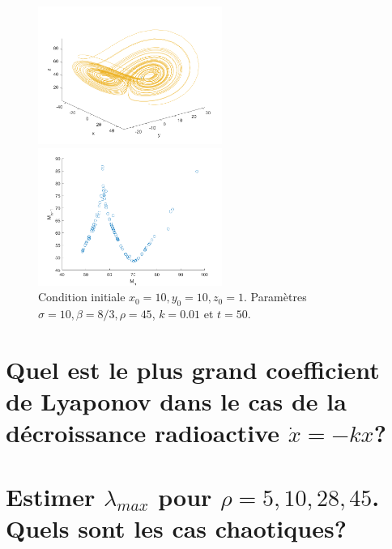 \documentclass[a4paper, 12pt]{report}
\begin{document}
\begin{figure}[H]
    \centering
    \begin{minipage}[t]{6cm}
        \centering
        \includegraphics[width=6cm]{images/lorenz45.png}
    \end{minipage}\hspace{1cm}
    \begin{minipage}[t]{6cm}
        \centering
        \includegraphics[width=6cm]{images/lorenz_m_45.png}
    \end{minipage}
    \caption{Condition initiale $x_0 = 10, y_0 = 10, z_0=1$. Paramètres $\sigma=10, \beta=8/3, \rho=45$, $k=0.01$ et $t=50$.}
\end{figure}


\section{Quel est le plus grand coefficient de Lyaponov dans le cas de la
décroissance radioactive $\dot{x} = -kx$?}

\section{Estimer $\lambda_{max}$ pour $\rho=5,10,28,45$. Quels sont les cas
chaotiques?}

\end{document}
